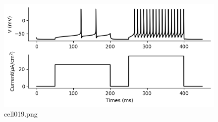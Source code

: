 \begin{figure}[ht]
	\centering
	\includegraphics[scale=0.8, max width=\linewidth]{./fig/neuron-model/hodgkin-huxley/cell019.png}
	\caption{cell019.png}
	\label{cell019.png}
\end{figure}